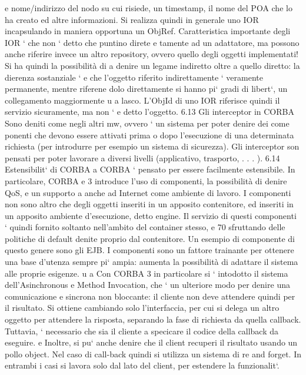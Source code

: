 \documentclass[a4paper,12pt]{article}
\begin{document}
e
nome/indirizzo del nodo su cui risiede, un timestamp, il nome del POA che lo ha
creato ed altre informazioni. Si realizza quindi in generale uno IOR incapsulando
in maniera opportuna un ObjRef.
Caratteristica importante degli IOR ` che non ` detto che puntino direte
e
tamente ad un adattatore, ma possono anche riferire invece un altro repository, ovvero quello degli oggetti
implementati! Si ha quindi la possibilità di
a
denire un legame indiretto oltre a quello diretto: la dierenza sostanziale `
e
che l'oggetto riferito indirettamente ` veramente permanente, mentre riferene
dolo direttamente si hanno pi` gradi di libert`, un collegamento maggiormente
u
a
lasco. L'ObjId di uno IOR riferisce quindi il servizio sicuramente, ma non `
e
detto l'oggetto.
6.13
Gli interceptor in CORBA
Sono deniti come negli altri mw, ovvero ` un sistema per poter denire dei come
ponenti che devono essere attivati prima o dopo l'esecuzione di una determinata
richiesta (per introdurre per esempio un sistema di sicurezza). Gli interceptor
son pensati per poter lavorare a diversi livelli (applicativo, trasporto, . . . ).
6.14
Estensibilit` di CORBA
a
CORBA ` pensato per essere facilmente estensibile. In particolare, CORBA
e
3 introduce l'uso di componenti, la possibilità di denire QoS, e un supporto
a
anche ad Internet come ambiente di lavoro.
I componenti non sono altro che degli oggetti inseriti in un apposito contenitore, ed inseriti in un apposito ambiente
d'esecuzione, detto engine. Il servizio
di questi componenti ` quindi fornito soltanto nell'ambito del container stesso,
e
70
\newpage
sfruttando delle politiche di default denite proprio dal contenitore. Un esempio
di componente di questo genere sono gli EJB.
I componenti sono un fattore trainante per ottenere una base d'utenza sempre pi` ampia: aumenta la possibilità di
adattare il sistema alle proprie esigenze.
u
a
Con CORBA 3 in particolare si ` intodotto il sistema dell'Asinchronous
e
Method Invocation, che ` un ulteriore modo per denire una comunicazione
e
sincrona non bloccante: il cliente non deve attendere quindi per il risultato.
Si ottiene cambiando solo l'interfaccia, per cui si delega un altro oggetto per
attendere la risposta, separando la fase di richiesta da quella callback. Tuttavia,
` necessario che sia il cliente a specicare il codice della callback da eseguire.
e
Inoltre, si pu` anche denire che il client recuperi il risultato usando un pollo
object. Nel caso di call-back quindi si utilizza un sistema di re and forget. In
entrambi i casi si lavora solo dal lato del client, per estendere la funzionalit`.
\end{document}
